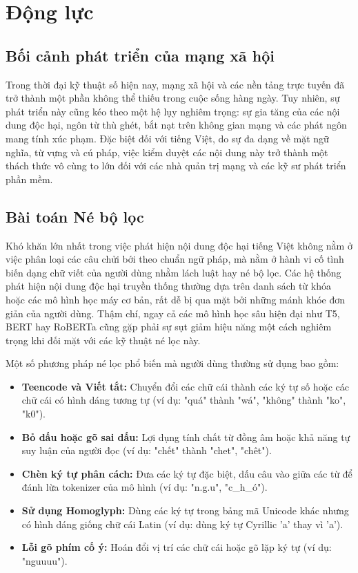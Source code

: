 \documentclass[12pt,a4paper]{article}
\begin{document}
\newpage
\section{Động lực}
\subsection{Bối cảnh phát triển của mạng xã hội}
Trong thời đại kỹ thuật số hiện nay, mạng xã hội và các nền tảng trực tuyến đã trở thành một phần không thể thiếu trong cuộc sống hàng ngày. Tuy nhiên, sự phát triển này cũng kéo theo một hệ lụy nghiêm trọng: sự gia tăng của các nội dung độc hại, ngôn từ thù ghét, bắt nạt trên không gian mạng và các phát ngôn mang tính xúc phạm. Đặc biệt đối với tiếng Việt, do sự đa dạng về mặt ngữ nghĩa, từ vựng và cú pháp, việc kiểm duyệt các nội dung này trở thành một thách thức vô cùng to lớn đối với các nhà quản trị mạng và các kỹ sư phát triển phần mềm.

\subsection{Bài toán Né bộ lọc}
Khó khăn lớn nhất trong việc phát hiện nội dung độc hại tiếng Việt không nằm ở việc phân loại các câu chửi bới theo chuẩn ngữ pháp, mà nằm ở hành vi cố tình biến dạng chữ viết của người dùng nhằm lách luật hay né bộ lọc. Các hệ thống phát hiện nội dung độc hại truyền thống thường dựa trên danh sách từ khóa hoặc các mô hình học máy cơ bản, rất dễ bị qua mặt bởi những mánh khóe đơn giản của người dùng. Thậm chí, ngay cả các mô hình học sâu hiện đại như T5, BERT hay RoBERTa cũng gặp phải sự sụt giảm hiệu năng một cách nghiêm trọng khi đối mặt với các kỹ thuật né lọc này.

Một số phương pháp né lọc phổ biến mà người dùng thường sử dụng bao gồm:
\begin{itemize}
    \item \textbf{Teencode và Viết tắt:} Chuyển đổi các chữ cái thành các ký tự số hoặc các chữ cái có hình dáng tương tự (ví dụ: "quá" thành "wá", "không" thành "ko", "k0").
    \item \textbf{Bỏ dấu hoặc gõ sai dấu:} Lợi dụng tính chất từ đồng âm hoặc khả năng tự suy luận của người đọc (ví dụ: "chết" thành "chet", "chêt").
    \item \textbf{Chèn ký tự phân cách:} Đưa các ký tự đặc biệt, dấu câu vào giữa các từ để đánh lừa tokenizer của mô hình (ví dụ: "n.g.u", "c\_h\_ó").
    \item \textbf{Sử dụng Homoglyph:} Dùng các ký tự trong bảng mã Unicode khác nhưng có hình dáng giống chữ cái Latin (ví dụ: dùng ký tự Cyrillic 'a' thay vì 'a').
    \item \textbf{Lỗi gõ phím cố ý:} Hoán đổi vị trí các chữ cái hoặc gõ lặp ký tự (ví dụ: "nguuuu").
\end{itemize}
\end{document}
